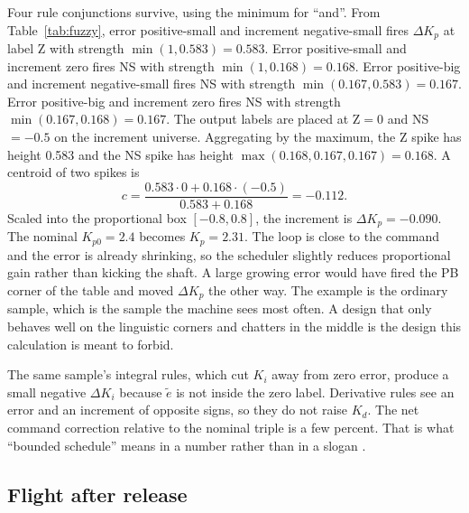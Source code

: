 Four rule conjunctions survive, using the minimum for ``and''. From Table~\ref{tab:fuzzy}, error positive-small and increment negative-small fires $\Delta K_p$ at label Z with strength $\min(1,0.583)=0.583$. Error positive-small and increment zero fires NS with strength $\min(1,0.168)=0.168$. Error positive-big and increment negative-small fires NS with strength $\min(0.167,0.583)=0.167$. Error positive-big and increment zero fires NS with strength $\min(0.167,0.168)=0.167$. The output labels are placed at Z$=0$ and NS$=-0.5$ on the increment universe. Aggregating by the maximum, the Z spike has height 0.583 and the NS spike has height $\max(0.168,0.167,0.167)=0.168$. A centroid of two spikes is
\begin{equation}
c = \frac{0.583\cdot 0 + 0.168\cdot(-0.5)}{0.583+0.168} = -0.112.
\end{equation}
Scaled into the proportional box $[-0.8,0.8]$, the increment is $\Delta K_p=-0.090$. The nominal $K_{p0}=2.4$ becomes $K_p=2.31$. The loop is close to the command and the error is already shrinking, so the scheduler slightly reduces proportional gain rather than kicking the shaft. A large growing error would have fired the PB corner of the table and moved $\Delta K_p$ the other way. The example is the ordinary sample, which is the sample the machine sees most often. A design that only behaves well on the linguistic corners and chatters in the middle is the design this calculation is meant to forbid.

The same sample's integral rules, which cut $K_i$ away from zero error, produce a small negative $\Delta K_i$ because $\tilde e$ is not inside the zero label. Derivative rules see an error and an increment of opposite signs, so they do not raise $K_d$. The net command correction relative to the nominal triple is a few percent. That is what ``bounded schedule'' means in a number rather than in a slogan \cite{mamdani1974,takagi1985}.

\subsection{Flight after release}
\label{sec:flight}

